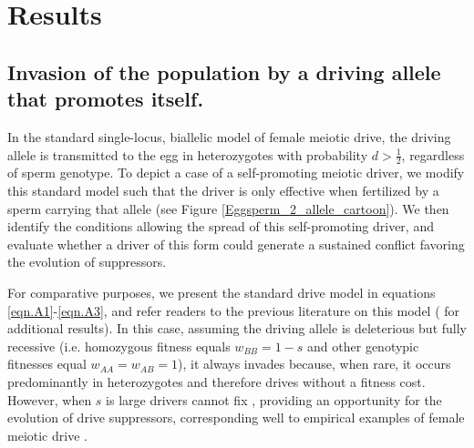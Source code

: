 \documentclass[12pt,letterpaper]{article}
\newcommand{\yb}[1]{{ \color{blue} #1}}
\begin{document}
\section*{Results}

\subsection*{ Invasion of the population by a driving allele that promotes
itself.}

In the standard single-locus, biallelic model of female meiotic drive, the driving allele is transmitted to the egg  in heterozygotes with probability  $d > \frac{1}{2}$, regardless of sperm genotype. 
To depict a case of a self-promoting meiotic
driver,  we modify this standard model such that the driver is only effective when fertilized by a sperm carrying that allele (see Figure
\ref{Eggsperm_2_allele_cartoon}). 
We then identify the conditions allowing the spread of this self-promoting driver, 
	and evaluate whether a driver of this form could generate a sustained conflict favoring the evolution of suppressors. 


For comparative purposes, we present the standard drive model in equations \ref{eqn.A1}-\ref{eqn.A3}, 
	and refer readers to the previous literature on this model (\citep[e.g. ][]{Prout1973,Ubeda2004} for additional results). 
In this case, assuming the driving allele is deleterious but fully recessive 
	(i.e. homozygous fitness equals $w_{BB}=1-s$ and other genotypic fitnesses equal $w_{AA}=w_{AB}=1$), 
	it always invades because,  when rare, it occurs predominantly in heterozygotes and therefore drives without a fitness cost. 
However, when $s$ is large drivers cannot fix \citep{Prout1973}, 
	providing an opportunity for the evolution of
	drive suppressors, corresponding well to 
	empirical examples of female meiotic drive \citep[reviewed in ][]{Burt2006}. 
\end{document}
